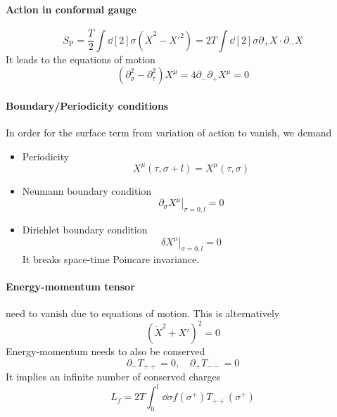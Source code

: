 \documentclass[12pt, a4paper, DIV=15]{article}
\numberwithin{equation}{section}
\begin{document}
\paragraph{Action in conformal gauge}
\begin{equation}
	S_\text{P} = \frac{T}{2} \int \dd[2]{\sigma} (\dot{X}^2 - X'^2) = 2 T \int\dd[2]{\sigma} \partial_+ X \cdot \partial_- X
\end{equation}
It leads to the equations of motion
\begin{equation}
	(\partial_\sigma ^2 - \partial_\tau^2)X^\mu = 4 \partial_- \partial_+ X^\mu = 0
\end{equation}

\paragraph{Boundary/Periodicity conditions}
In order for the surface term from variation of action to vanish, we demand
\begin{itemize}
	\item Periodicity 
		\begin{equation}
			X^\mu (\tau, \sigma + l) = X^\mu(\tau, \sigma)
		\end{equation}
	\item Neumann boundary condition
		\begin{equation}
			\left. \partial_\sigma X^\mu \right|_{\sigma=0,l} = 0
		\end{equation}
	\item Dirichlet boundary condition
		\begin{equation}
			\left. \delta X^\mu \right|_{\sigma=0,l} = 0
		\end{equation}
		It breaks space-time Poincare invariance.
\end{itemize}

\paragraph{Energy-momentum tensor}
need to vanish due to equations of motion. This is alternatively
\begin{equation}
	\left( \dot{X}^2 + X' \right)^2 = 0
	\label{math:constr-sqr}
\end{equation}
Energy-momentum needs to also be conserved
\begin{equation}
	\partial_- T_{++} =0, \quad \partial_+ T_{--} = 0
\end{equation}
It implies an infinite number of conserved charges
\begin{equation}
	L_f = 2T\int_0^l \dd{\sigma} f(\sigma^+) T_{++}(\sigma^+)
\end{equation}
\end{document}
